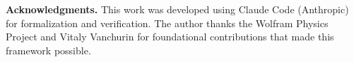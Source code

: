 \documentclass[11pt,a4paper]{article}
\theoremstyle{plain}
\theoremstyle{definition}
\begin{document}
\vspace{1em}
\noindent\textbf{Acknowledgments.}  This work was developed using
Claude Code (Anthropic) for formalization and verification.
The author thanks the Wolfram Physics Project and Vitaly Vanchurin
for foundational contributions that made this framework possible.


\printbibliography
\end{document}
